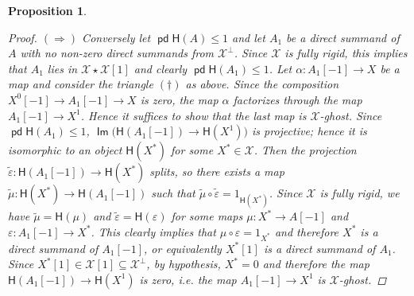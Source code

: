 \documentclass[oneside, a4paper,reqno]{amsart}
\numberwithin{equation}{section}
\newtheorem{prop}[thm]{Proposition}
\theoremstyle{definition}
\begin{document}
\begin{prop}
\begin{proof}
$(\Longrightarrow)$ Conversely let $\operatorname{\mathsf{pd}}\mathsf{H}(A) \leq 1$ and let $A_{1}$ be a direct summand of $A$ with no non-zero direct summands from ${\mathcal X}^{\bot}$. Since ${\mathcal X}$ is fully rigid, this implies that $A_{1}$ lies in ${\mathcal X}\star {\mathcal X}[1]$ and clearly $\operatorname{\mathsf{pd}} \mathsf{H}(A_{1}) \leq 1$. Let $\alpha \colon A_{1}[-1] {\longrightarrow} X$ be a map
 and consider the triangle $(\dag)$ as above. Since the composition $X^{0}[-1] {\longrightarrow} A_{1}[-1] {\longrightarrow} X$ is zero, the map $\alpha$ factorizes through the map $A_{1}[-1] {\longrightarrow} X^{1}$. Hence it suffices to show that the last map is ${\mathcal X}$-ghost. Since $\operatorname{\mathsf{pd}}\mathsf{H}(A_{1}) \leq 1$,  $\operatorname*{\mathsf{Im}}\big(\mathsf{H}(A_{1}[-1]) {\longrightarrow} \mathsf{H}(X^{1})\big)$ is projective; hence it is isomorphic to an object $\mathsf{H}(X^{*})$ for some $X^{*} \in {\mathcal X}$. Then the projection $\widetilde{\varepsilon} \colon \mathsf{H}(A_{1}[-1]) {\longrightarrow} \mathsf{H}(X^{*})$ splits, so there exists a map $\widetilde{\mu} \colon \mathsf{H}(X^{*})  {\longrightarrow} \mathsf{H}(A_{1}[-1])$ such that $\widetilde{\mu} \circ \widetilde{\varepsilon} = 1_{\mathsf{H}(X^{*})}$.  Since ${\mathcal X}$ is fully rigid, we have  $\widetilde{\mu} = \mathsf{H}(\mu)$ and $\widetilde{\varepsilon} = \mathsf{H}(\varepsilon)$ for some maps $\mu \colon X^{*} {\longrightarrow} A[-1]$ and $\varepsilon \colon A_{1}[-1] {\longrightarrow} X^{*}$. This clearly implies that $\mu \circ \varepsilon = 1_{X^{*}}$ and therefore $X^{*}$ is a direct summand of $A_{1}[-1]$, or equivalently $X^{*}[1]$ is a direct summand of $A_{1}$. Since $X^{*}[1] \in {\mathcal X}[1] \subseteq {\mathcal X}^{\bot}$, by hypothesis,  $X^{*} = 0$ and therefore the map  $\mathsf{H}(A_{1}[-1]) {\longrightarrow} \mathsf{H}(X^{1})$ is zero, i.e. the map $A_{1}[-1] {\longrightarrow} X^{1}$ is ${\mathcal X}$-ghost. 
 


\end{proof}
\end{prop}
\end{document}
